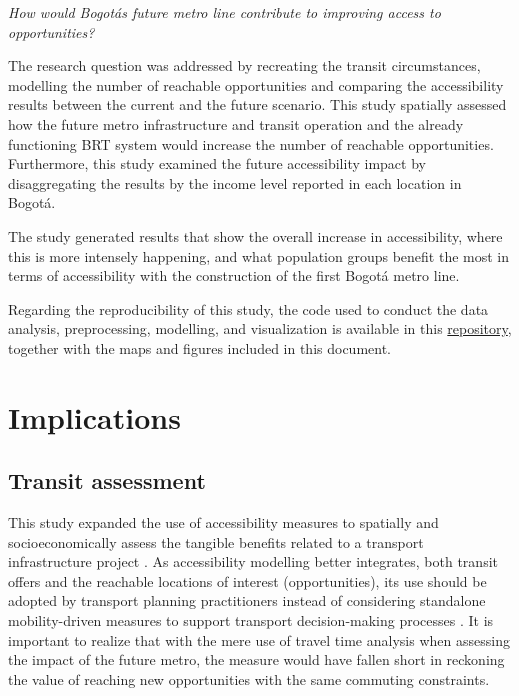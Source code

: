 \documentclass[12pt, a4paper]{report}
\begin{document}
\begin{center}
    \textit{How would Bogot\'{a}\textquotesingle s future metro line contribute to improving access to opportunities?} 
\end{center}

The research question was addressed by recreating the transit circumstances, modelling the number of reachable opportunities and comparing the accessibility results between the current and the future scenario. This study spatially assessed how the future metro infrastructure and transit operation and the already functioning BRT system would increase the number of reachable opportunities. Furthermore, this study examined the future accessibility impact by disaggregating the results by the income level reported in each location in Bogotá.

The study generated results that show the overall increase in accessibility, where this is more intensely happening, and what population groups benefit the most in terms of accessibility with the construction of the first Bogotá metro line.


Regarding the reproducibility of this study, the code used to conduct the data analysis, preprocessing, modelling, and visualization is available in this \href{https://github.com/rpoandres/MSc_USS_Dissertation}{repository}, together with the maps and figures included in this document.

\section{Implications}

\subsection{Transit assessment}

This study expanded the use of accessibility measures to spatially and socioeconomically assess the tangible benefits related to a transport infrastructure project \citep{bocarejos.TransportAccessibilitySocial2012,bocarejoAccessibilityAnalysisIntegrated2014,guzmanAssessingEquityTransport2017}. As accessibility modelling better integrates, both transit offers and the reachable locations of interest (opportunities), its use should be adopted by transport planning practitioners instead of considering standalone mobility-driven measures to support transport decision-making processes \citep{ferreiraAccessibilityGoldMobility2012}. It is important to realize that with the mere use of travel time analysis when assessing the impact of the future metro, the measure would have fallen short in reckoning the value of reaching new opportunities with the same commuting constraints.
\end{document}
